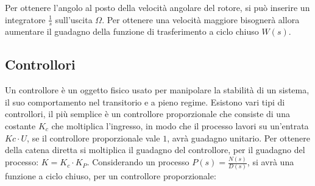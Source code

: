 \documentclass{article}
\numberwithin{equation}{subsection}
\begin{document}
\begin{center}\end{center}
Per ottenere l'angolo al posto della velocità angolare del rotore, si può inserire un integratore $\displaystyle\frac{1}{s}$ sull'uscita $\Omega$. Per ottenere una velocità 
maggiore bisognerà allora aumentare il guadagno della funzione di trasferimento a ciclo chiuso $W(s)$. 

\subsection{Controllori}

Un controllore è un oggetto fisico usato per manipolare la stabilità di un sistema, il suo comportamento nel transitorio e a pieno regime. 
Esistono vari tipi di controllori, il più semplice è un controllore proporzionale che consiste di una costante $K_c$ che moltiplica l'ingresso, in modo 
che il processo lavori su un'entrata $Kc\cdot U$, se il controllore proporzionale vale $1$, avrà guadagno unitario. Per ottenere della catena 
diretta si moltiplica il guadagno del controllore, per il guadagno del processo: $K=K_c\cdot K_P$. Considerando un processo 
$P(s)=\displaystyle\frac{N(s)}{D(s)}$, si avrà una funzione a ciclo chiuso, per un controllore proporzionale: 
\end{document}
